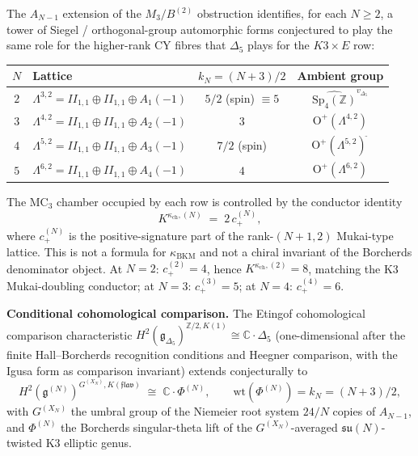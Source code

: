 \begin{remark}
\label{rem:m3b2-gaiotto-kn-family}
The $A_{N-1}$ extension of the $M_3/B^{(2)}$ obstruction identifies, for
each $N \geq 2$, a tower of Siegel / orthogonal-group automorphic
forms conjectured to play the same role for the higher-rank CY fibres
that $\Delta_5$ plays for the $K3\times E$ row:

\begin{center}
\begin{tabular}{c|lcc}
$N$ & Lattice & $k_N = (N{+}3)/2$ & Ambient group \\\hline
$2$ & $\Lambda^{3,2} = II_{1,1}\oplus II_{1,1}\oplus A_1(-1)$
 & $5/2$ (spin) $\equiv 5$ & $\widehat{\mathrm{Sp}_4(\mathbb Z)}^{v_{\Delta_5}}$ \\
$3$ & $\Lambda^{4,2} = II_{1,1}\oplus II_{1,1}\oplus A_2(-1)$
 & $3$ & $\mathrm{O}^+(\Lambda^{4,2})$ \\
$4$ & $\Lambda^{5,2} = II_{1,1}\oplus II_{1,1}\oplus A_3(-1)$
 & $7/2$ (spin) & $\mathrm{O}^+(\Lambda^{5,2})^{\widetilde{\ }}$ \\
$5$ & $\Lambda^{6,2} = II_{1,1}\oplus II_{1,1}\oplus A_4(-1)$
 & $4$ & $\mathrm{O}^+(\Lambda^{6,2})$ \\
\end{tabular}
\end{center}

The MC$_3$ chamber occupied by each row is controlled by the conductor
identity
\[
K^{\kappa_{\mathrm{ch}},(N)}
\;=\;2\,c_+^{(N)},
\]
where $c_+^{(N)}$ is the positive-signature part of the rank-$(N{+}1,2)$
Mukai-type lattice. This is not a formula for
\(\kappa_{\mathrm{BKM}}\) and not a chiral invariant of the
Borcherds denominator object. At $N=2$: $c_+^{(2)} = 4$, hence
\(K^{\kappa_{\mathrm{ch}},(2)}=8\), matching the K3
Mukai-doubling conductor; at $N=3$: $c_+^{(3)} = 5$; at $N=4$:
$c_+^{(4)} = 6$.

\textbf{Conditional cohomological comparison.} The
Etingof cohomological comparison characteristic
$H^2(\mathfrak{g}_{\Delta_5})^{\mathbb Z/2, K(1)} \cong \mathbb C \cdot \Delta_5$
(one-dimensional after the finite Hall--Borcherds recognition conditions and
Heegner comparison, with the Igusa form as comparison invariant)
extends conjecturally to
\[
H^2(\mathfrak{g}^{(N)})^{G^{(X_N)}, K(\mathfrak{flav})}
\;\cong\;
\mathbb C \cdot \Phi^{(N)},
\qquad
\mathrm{wt}(\Phi^{(N)}) = k_N = (N+3)/2,
\]
with $G^{(X_N)}$ the umbral group of the Niemeier root system $24/N$
copies of $A_{N-1}$, and $\Phi^{(N)}$ the Borcherds singular-theta lift
of the $G^{(X_N)}$-averaged $\mathfrak{su}(N)$-twisted K3 elliptic genus.


\end{remark}
